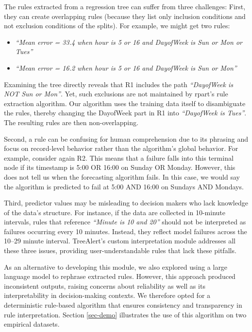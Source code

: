 \documentclass[preprint,12pt]{elsarticle}
\begin{document}
The rules extracted from a regression tree can suffer from three challenges: First, they can create overlapping rules (because they list only inclusion conditions and not exclusion conditions of the splits). For example, we might get two rules:

\begin{itemize}
    \item[(R1)] \textit{``Mean error = 33.4 when hour is 5 or 16 and DayofWeek is Sun or Mon or Tues''}
    \item[(R2)] \textit{``Mean error = 16.2 when hour is 5 or 16 and DayofWeek is Sun or Mon''}
\end{itemize}

Examining the tree directly reveals that R1 includes the path \textit{``DayofWeek is NOT Sun or Mon''}. Yet, such exclusions are not maintained by rpart's rule extraction algorithm. Our algorithm uses the training data itself to disambiguate the rules, thereby changing the DayofWeek part in R1 into \textit{``DayofWeek is Tues''}. The resulting rules are then non-overlapping.

Second, a rule can be confusing for human comprehension due to its phrasing and focus on record-level behavior rather than the algorithm’s global behavior. For example, consider again R2. This means that a failure falls into this terminal node if its timestamp is 5:00 OR 16:00 on Sunday OR Monday. However, this does not tell us when the forecasting algorithm fails. In this case, we would say the algorithm is predicted to fail at 5:00 AND 16:00 on Sundays AND Mondays. 

Third, predictor values may be misleading to decision makers who lack knowledge of the data’s structure. For instance, if the data are collected in 10-minute intervals, rules that reference  \textit{``Minute is 10 and 20”} should not be interpreted as failures occurring every 10 minutes. Instead, they reflect model failures across the 10–29 minute interval. TreeAlert’s custom interpretation module addresses all these three issues, providing user-understandable rules that lack these pitfalls.

As an alternative to developing this module, we also explored using a large language model to rephrase extracted rules. However, this approach produced inconsistent outputs, raising concerns about reliability as well as its interpretability in decision-making contexts. We therefore opted for a deterministic rule-based algorithm that ensures consistency and transparency in rule interpretation. Section \ref{sec-demo} illustrates the use of this algorithm on two empirical datasets.
\end{document}
